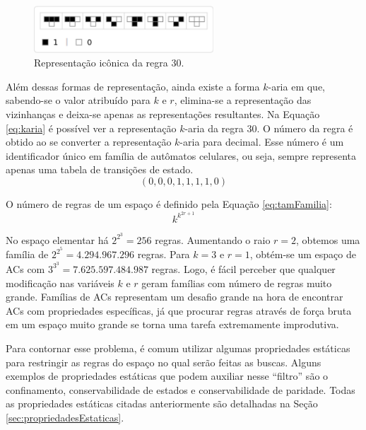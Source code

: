 \documentclass[12pt,a4paper]{article}
\begin{document}
	\begin{figure}[h!]
	  \centering
	  \includegraphics[width=0.6\textwidth]{fig_repIconicaR30.pdf}
	  \caption{Representação icônica da regra 30.}
	  \label{fig:repIconicaR30}
	\end{figure}

Além dessas formas de representação, ainda existe a forma $k$-aria em que, sabendo-se o valor atribuído para $k$ e $r$, elimina-se a representação das vizinhanças e deixa-se apenas as representações resultantes. Na Equação \ref{eq:karia} é possível ver a representação $k$-aria da regra 30. O número da regra é obtido ao se converter a representação $k$-aria para decimal. Esse número é um identificador único em família de autômatos celulares, ou seja, sempre representa apenas uma tabela de transições de estado.
\begin{equation}
(0,0,0,1,1,1,1,0)
\label{eq:karia}
\end{equation}

O número de regras de um espaço é definido pela Equação \ref{eq:tamFamilia}:
\begin{equation}
k^{k^{2r+1}}
\label{eq:tamFamilia}
\end{equation}

No espaço elementar há $2^{2^{3}} = 256$ regras. Aumentando o raio $r=2$, obtemos uma família de $2^{2^{5}} = 4.294.967.296$ regras. Para $k=3$ e $r=1$, obtém-se um espaço de ACs com $3^{3^{3}} = 7.625.597.484.987$ regras. Logo, é fácil perceber que qualquer modificação nas variáveis $k$ e $r$ geram famílias com número de regras muito grande. Famílias de ACs representam um desafio grande na hora de encontrar ACs com propriedades específicas, já que procurar regras através de força bruta em um espaço muito grande se torna uma tarefa extremamente improdutiva.

Para contornar esse problema, é comum utilizar algumas propriedades estáticas para restringir as regras do espaço no qual serão feitas as buscas. Alguns exemplos de propriedades estáticas que podem auxiliar nesse ``filtro'' são o confinamento, conservabilidade de estados e conservabilidade de paridade. Todas as propriedades estáticas citadas anteriormente são detalhadas na Seção \ref{sec:propriedadesEstaticas}.
\end{document}
